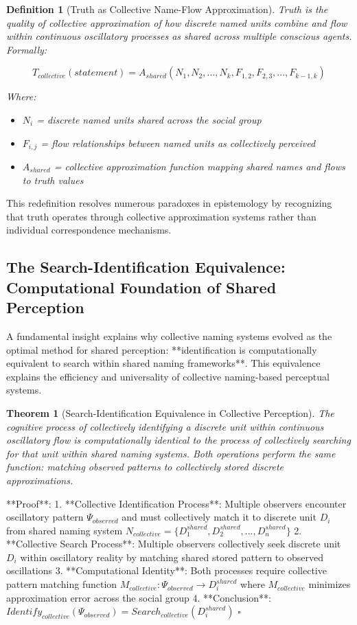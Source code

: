\documentclass[12pt]{article}
\newtheorem{theorem}{Theorem}
\newtheorem{definition}{Definition}
\begin{document}
\begin{definition}[Truth as Collective Name-Flow Approximation]
Truth is the quality of collective approximation of how discrete named units combine and flow within continuous oscillatory processes as shared across multiple conscious agents. Formally:

$$T_{collective}(statement) = A_{shared}(N_1, N_2, ..., N_k, F_{1,2}, F_{2,3}, ..., F_{k-1,k})$$

Where:
\begin{itemize}
\item $N_i$ = discrete named units shared across the social group
\item $F_{i,j}$ = flow relationships between named units as collectively perceived
\item $A_{shared}$ = collective approximation function mapping shared names and flows to truth values
\end{itemize}
\end{definition}

This redefinition resolves numerous paradoxes in epistemology by recognizing that truth operates through collective approximation systems rather than individual correspondence mechanisms.

\subsection{The Search-Identification Equivalence: Computational Foundation of Shared Perception}

A fundamental insight explains why collective naming systems evolved as the optimal method for shared perception: **identification is computationally equivalent to search within shared naming frameworks**. This equivalence explains the efficiency and universality of collective naming-based perceptual systems.

\begin{theorem}[Search-Identification Equivalence in Collective Perception]
The cognitive process of collectively identifying a discrete unit within continuous oscillatory flow is computationally identical to the process of collectively searching for that unit within shared naming systems. Both operations perform the same function: matching observed patterns to collectively stored discrete approximations.
\end{theorem}

**Proof**:
1. **Collective Identification Process**: Multiple observers encounter oscillatory pattern $\Psi_{observed}$ and must collectively match it to discrete unit $D_i$ from shared naming system $N_{collective} = \{D_1^{shared}, D_2^{shared}, ..., D_n^{shared}\}$
2. **Collective Search Process**: Multiple observers collectively seek discrete unit $D_i$ within oscillatory reality by matching shared stored pattern to observed oscillations
3. **Computational Identity**: Both processes require collective pattern matching function $M_{collective}: \Psi_{observed} \rightarrow D_i^{shared}$ where $M_{collective}$ minimizes approximation error across the social group
4. **Conclusion**: $Identify_{collective}(\Psi_{observed}) = Search_{collective}(D_i^{shared})$ $\square$
\end{document}
